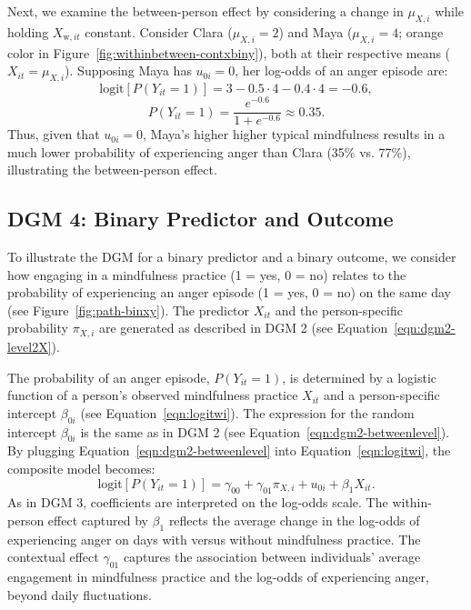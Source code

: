 \documentclass[stu]{apa7}
\begin{document}
Next, we examine the between-person effect by considering a change in \( \mu_{X,i} \) while holding \( X_{\text{w},it} \) constant. Consider Clara (\( \mu_{X,i} = 2 \)) and Maya (\( \mu_{X,i} = 4 \); orange color in Figure~\ref{fig:withinbetween-contxbiny}), both at their respective means (\( X_{it} = \mu_{X,i} \)). Supposing Maya has \( u_{0i} = 0 \), her log-odds of an anger episode are:
$$\text{logit} \left[ P(Y_{it} = 1) \right] = 3  - 0.5 \cdot 4 -0.4 \cdot 4  = -0.6,$$
\[
P(Y_{it} = 1) = \frac{e^{-0.6}}{1 + e^{-0.6}} \approx 0.35.
\]
Thus, given that \( u_{0i} = 0 \), Maya’s higher higher typical mindfulness results in a much lower probability of experiencing anger than Clara (35\% vs. 77\%), illustrating the between-person effect.

\subsection{DGM 4: Binary Predictor and Outcome}

To illustrate the DGM for a binary predictor and a binary outcome, we consider how engaging in a mindfulness practice (1 = yes, 0 = no) relates to the probability of experiencing an anger episode (1 = yes, 0 = no) on the same day (see Figure~\ref{fig:path-binxy}). The predictor \( X_{it} \) and the person-specific probability \( \pi_{X,i} \) are generated as described in DGM 2 (see Equation~\ref{eqn:dgm2-level2X}).

The probability of an anger episode, \( P(Y_{it} = 1) \), is determined by a logistic function of a person's observed mindfulness practice \( X_{it} \) and a person-specific intercept \( \beta_{0i} \) (see Equation~\ref{eqn:logitwi}). The expression for the random intercept \( \beta_{0i} \) is the same as in DGM 2 (see Equation~\ref{eqn:dgm2-betweenlevel}). By plugging Equation~\ref{eqn:dgm2-betweenlevel} into Equation~\ref{eqn:logitwi}, the composite model becomes:
\begin{equation}
    \text{logit} \left[ P(Y_{it} = 1) \right] = \gamma_{00} + \gamma_{01} \pi_{X,i} + u_{0i} + \beta_1 X_{it}.
\end{equation}
As in DGM 3, coefficients are interpreted on the log-odds scale. The within-person effect captured by $\beta_1$ reflects the average change in the log-odds of experiencing anger on days with versus without mindfulness practice. The contextual effect $\gamma_{01}$ captures the association between individuals’ average engagement in mindfulness practice and the log-odds of experiencing anger, beyond daily fluctuations.
\end{document}
